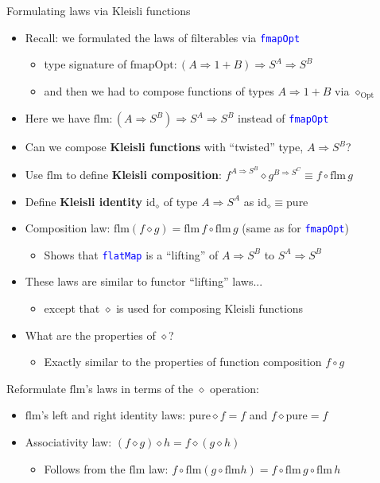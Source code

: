 \documentclass[english]{beamer}
\begin{document}
\begin{frame}{Formulating laws via Kleisli functions}
\begin{itemize}
\item Recall: we formulated the laws of filterables via \texttt{\textcolor{blue}{\footnotesize{}fmapOpt}} 
\begin{itemize}
\item type signature of $\text{fmapOpt}:\left(A\Rightarrow1+B\right)\Rightarrow S^{A}\Rightarrow S^{B}$
\item and then we had to compose functions of types $A\Rightarrow1+B$ via
$\diamond_{\text{Opt}}$
\end{itemize}
\item Here we have{\small{} $\text{flm}:\left(A\Rightarrow S^{B}\right)\Rightarrow S^{A}\Rightarrow S^{B}$}
instead of \texttt{\textcolor{blue}{\footnotesize{}fmapOpt}} 
\item Can we compose \textbf{Kleisli functions} with ``twisted'' type,
$A\Rightarrow S^{B}$?
\item Use $\text{flm}$ to define \textbf{Kleisli composition}: $f^{A\Rightarrow S^{B}}\diamond g^{B\Rightarrow S^{C}}\equiv f\circ\text{flm}\,g$
\item Define \textbf{Kleisli identity} $\text{id}_{\diamond}$ of type $A\Rightarrow S^{A}$
as $\text{id}_{\diamond}\equiv\text{pure}$
\item Composition law: $\text{flm}\left(f\diamond g\right)=\text{flm}\,f\circ\text{flm}\,g$
(same as for \texttt{\textcolor{blue}{\footnotesize{}fmapOpt}})
\begin{itemize}
\item Shows that \texttt{\textcolor{blue}{\footnotesize{}flatMap}} is a
``lifting'' of $A\Rightarrow S^{B}$ to $S^{A}\Rightarrow S^{B}$
\end{itemize}
\item These laws are similar to functor ``lifting'' laws...
\begin{itemize}
\item except that $\diamond$ is used for composing Kleisli functions
\end{itemize}
\item What are the properties of $\diamond$?
\begin{itemize}
\item Exactly similar to the properties of function composition $f\circ g$
\end{itemize}
\end{itemize}
Reformulate $\text{flm}$'s laws in terms of the $\diamond$ operation:
\begin{itemize}
\item $\text{flm}$'s left and right identity laws: $\text{pure}\diamond f=f$
and $f\diamond\text{pure}=f$
\item Associativity law: $\left(f\diamond g\right)\diamond h=f\diamond\left(g\diamond h\right)$
\begin{itemize}
\item Follows from the $\text{flm}$ law: $f\circ\text{flm}\left(g\circ\text{flm}h\right)=f\circ\text{flm}\,g\circ\text{flm}\,h$
\end{itemize}
\end{itemize}
\end{frame}
\end{document}
